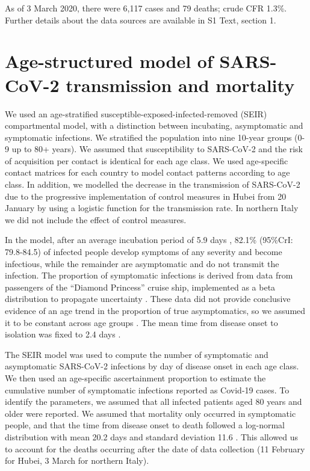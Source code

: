 \documentclass{article}
\begin{document}
As of 3 March 2020, there were 6,117 cases and 79 deaths; crude CFR 1.3\%.
Further details about the data sources are available in S1 Text, section 1. 




\section*{Age-structured model of SARS-CoV-2 transmission and mortality}

We used an age-stratified susceptible-exposed-infected-removed (SEIR) compartmental model, with a distinction between incubating, asymptomatic and symptomatic infections. 
We stratified the population into nine 10-year groups (0-9 up to 80+ years). 
We assumed that susceptibility to SARS-CoV-2 and the risk of acquisition per contact is identical for each age class. 
We used age-specific contact matrices for each country to model contact patterns according to age class. 
In addition, we modelled the decrease in the transmission of SARS-CoV-2 due to the progressive implementation of control measures in Hubei from 20 January by using a logistic function for the transmission rate. 
In northern Italy we did not include the effect of control measures.

In the model, after an average incubation period of 5.9 days \cite{Bi2020}, 82.1\% (95\%CrI: 79.8-84.5) of infected people develop symptoms of any severity and become infectious, while the remainder are asymptomatic and do not transmit the infection.
The proportion of symptomatic infections is derived from data from passengers of the ``Diamond Princess'' cruise ship, implemented as a beta distribution to propagate uncertainty \cite{mizumoto2020estimating}. 
These data did not provide conclusive evidence of an age trend in the proportion of true asymptomatics, so we assumed it to be constant across age groups \cite{JapaneseNationalInstituteofInfectiousDiseases2020}.
The mean time from disease onset to isolation was fixed to 2.4 days \cite{Bi2020}.

The SEIR model was used to compute the number of symptomatic and asymptomatic SARS-CoV-2 infections by day of disease onset in each age class.
We then used an age-specific ascertainment proportion to estimate the cumulative number of symptomatic infections reported as Covid-19 cases.
To identify the parameters, we assumed that all infected patients aged 80 years and older were reported.
We assumed that mortality only occurred in symptomatic people, and that the time from disease onset to death followed a log-normal distribution with mean 20.2 days and standard deviation 11.6 \cite{linton2020incubation}.
This allowed us to account for the deaths occurring after the date of data collection (11 February for Hubei, 3 March for northern Italy). 
\end{document}
